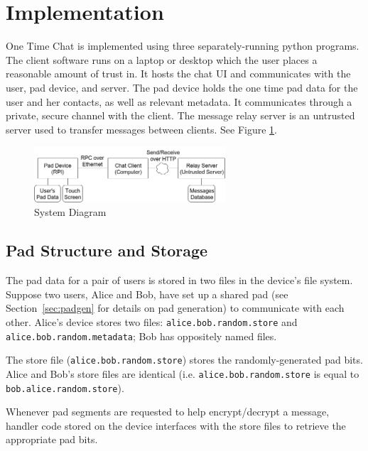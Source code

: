 \documentclass[twocolumn]{article}
\begin{document}

\section{Implementation}
One Time Chat is implemented using three separately-running python programs.
The client software runs on a laptop or desktop which the user places a reasonable amount of trust in. It hosts the chat UI and communicates with the user, pad device, and server.
The pad device holds the one time pad data for the user and her contacts, as well as relevant metadata. It communicates through a private, secure channel with the client.
The message relay server is an untrusted server used to transfer messages between clients. See Figure \ref{fig:systemd}.

\begin{figure}[htp]
\centering
\includegraphics[width=2.8in]{system-diagram}
\caption{System Diagram}
\label{fig:systemd}
\end{figure}

\subsection{Pad Structure and Storage}
\label{sec:padstruc}
The pad data for a pair of users is stored in two files in the device's file system. Suppose two users, Alice and Bob, have set up a shared pad (see Section~\ref{sec:padgen} for details on pad generation) to communicate with each other. Alice's device stores two files: \texttt{alice.bob.random.store} and \texttt{alice.bob.random.metadata}; Bob has oppositely named files.

The store file (\texttt{alice.bob}\texttt{.random.store}) stores the randomly-generated pad bits. Alice and Bob's store files are identical (i.e. \texttt{alice.bob.random.store} is equal to \texttt{bob.alice.random.store}).

Whenever pad segments are requested to help encrypt/decrypt a message, handler code stored on the device interfaces with the store files to retrieve the appropriate pad bits.
\end{document}
